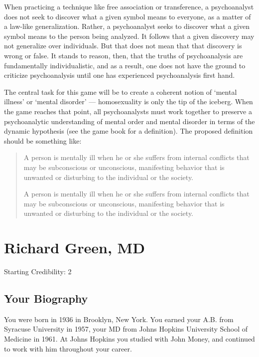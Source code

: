 \begin{refsection}
When practicing a technique like free association or transference, a psychoanalyst does not seek to discover what a given symbol means to everyone, as a matter of a law-like generalization. Rather, a psychoanalyst seeks to discover what a given symbol means to the person being analyzed. It follows that a given discovery may not generalize over individuals. But that does not mean that that discovery is wrong or false. It stands to reason, then, that the truths of psychoanalysis are fundamentally individualistic, and as a result, one does not have the ground to criticize psychoanalysis until one has experienced psychoanalysis first hand.

The central task for this game will be to create a coherent notion of ‘mental illness’ or ‘mental disorder’ — homosexuality is only the tip of the iceberg. When the game reaches that point, all psychoanalysts must work together to preserve a psychoanalytic understanding of mental order and mental disorder in terms of the dynamic hypothesis (see the game book for a definition). The proposed definition should be something like:

\begin{quote}

A person is mentally ill when he or she suffers from internal conflicts that may be subconscious or unconscious, manifesting behavior that is unwanted or disturbing to the individual or the society.\begin{proposal}[Psychoanalysts]\label{proposal:psychoanalysts}A person is mentally ill when he or she suffers from internal conflicts that may be subconscious or unconscious, manifesting behavior that is unwanted or disturbing to the individual or the society.\end{proposal}
\end{quote}

\chapter{Richard Green, MD}
\label{richardgreenmd}

Starting Credibility: 2

\section{Your Biography}
\label{yourbiography}

You were born in 1936 in Brooklyn, New York. You earned your A.B. from Syracuse University in 1957, your MD from Johns Hopkins University School of Medicine in 1961. At Johns Hopkins you studied with John Money, and continued to work with him throughout your career.


\end{refsection}
